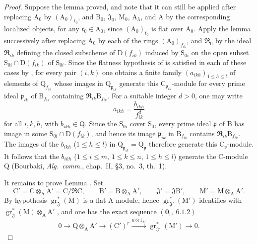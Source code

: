 \begin{proof}
Suppose the lemma proved, and note that it can still be applied after replacing
$\mathrm{A}_0$ by $(\mathrm{A}_0)_{t_0}$, and $\mathrm{B}_0$,
$\mathfrak{J}_0$, $\mathrm{M}_0$, $\mathrm{A}_\lambda$, and $\mathrm{A}$ by
the corresponding localized objects, for any $t_0\in\mathrm{A}_0$, since
$(\mathrm{A}_0)_{t_0}$ is flat over $\mathrm{A}_0$. Apply the lemma
successively after replacing $\mathrm{A}_0$ by each of the rings
$(\mathrm{A}_0)_{f_{ik}}$, and $\mathfrak{R}_0$ by the ideal
$\mathfrak{R}_{ik}$ defining the closed subscheme of $\mathrm{D}(f_{ik})$
induced by $\mathrm{S}_{0i}$ on the open subset
$\mathrm{S}_{0i}\cap\mathrm{D}(f_{ik})$ of $\mathrm{S}_{0i}$. Since the
flatness hypothesis of  is satisfied in each of these cases
by , for every pair $(i,k)$ one obtains a finite family
$(a_{ikh})_{1\leqslant h\leqslant l}$ of elements of
$\mathrm{Q}_{f_{ik}}$ whose images in $\mathrm{Q}_{\mathfrak{p}_{ik}}$
generate this $\mathrm{C}_{\mathfrak{p}_{ik}}$-module for every prime ideal
$\mathfrak{p}_{ik}$ of $\mathrm{B}_{f_{ik}}$ containing
$\mathfrak{R}_{ik}\mathrm{B}_{f_{ik}}$. For a suitable integer $d>0$, one
may write
\[
  a_{ikh}=\frac{b_{ikh}}{f_{ik}^{d}}
\]
for all $i,k,h$, with $b_{ikh}\in\mathrm{Q}$. Since the $\mathrm{S}_{0i}$ cover $\mathrm{S}_0$, every prime ideal $\mathfrak{p}$ of $\mathrm{B}$ has image in some $\mathrm{S}_{0i}\cap\mathrm{D}(f_{ik})$, and hence its image $\mathfrak{p}_{ik}$ in $\mathrm{B}_{f_{ik}}$ contains $\mathfrak{R}_{ik}\mathrm{B}_{f_{ik}}$. The images of the $b_{ikh}$ ($1\leqslant h\leqslant l$) in $\mathrm{Q}_{\mathfrak{p}_{ik}}=\mathrm{Q}_{\mathfrak{p}}$ therefore generate this $\mathrm{C}_{\mathfrak{p}}$-module. It follows that the $b_{ikh}$ ($1\leqslant i\leqslant m$, $1\leqslant k\leqslant n$, $1\leqslant h\leqslant l$) generate the $\mathrm{C}$-module $\mathrm{Q}$ (Bourbaki, \emph{Alg.\ comm.}, chap.~II, \S3, no.~3, th.~1).

It remains to prove Lemma . Set
\[
  \mathrm{C}'=\mathrm{C}\otimes_\mathrm{A}\mathrm{A}'=\mathrm{C}/\mathfrak{R}\mathrm{C},\qquad
  \mathrm{B}'=\mathrm{B}\otimes_\mathrm{A}\mathrm{A}',\qquad
  \mathfrak{J}'=\mathfrak{J}\mathrm{B}',\qquad
  \mathrm{M}'=\mathrm{M}\otimes_\mathrm{A}\mathrm{A}'.
\]
By hypothesis $\operatorname{gr}^*_\mathfrak{J}(\mathrm{M})$ is a flat $\mathrm{A}$-module, hence $\operatorname{gr}^*_{\mathfrak{J}'}(\mathrm{M}')$ identifies with $\operatorname{gr}^*_\mathfrak{J}(\mathrm{M})\otimes_\mathrm{A}\mathrm{A}'$ , and one has the exact sequence $(\mathbf{0}_\mathrm{I},~6.1.2)$
\begin{equation}
  0\longrightarrow\mathrm{Q}\otimes_\mathrm{A}\mathrm{A}'
  \longrightarrow(\mathrm{C}')^r
  \xrightarrow{u\otimes 1_{\mathrm{A}'}}
  \operatorname{gr}^*_{\mathfrak{J}'}(\mathrm{M}')
  \longrightarrow 0.
  \label{IV.11.2.9.7}
\tag{11.2.9.7}
\end{equation}


\end{proof}
